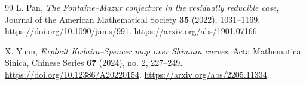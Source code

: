 \begin{thebibliography}{99}
L. Pan, \emph{The Fontaine--Mazur conjecture in the residually
reducible case}, Journal of the American Mathematical Society
\textbf{35} (2022), 1031--1169.
\url{https://doi.org/10.1090/jams/991}.
\url{https://arxiv.org/abs/1901.07166}.

X. Yuan, \emph{Explicit Kodaira--Spencer map over Shimura curves},
Acta Mathematica Sinica, Chinese Series \textbf{67} (2024), no. 2,
227--249. \url{https://doi.org/10.12386/A20220154}.
\url{https://arxiv.org/abs/2205.11334}.

\end{thebibliography}


